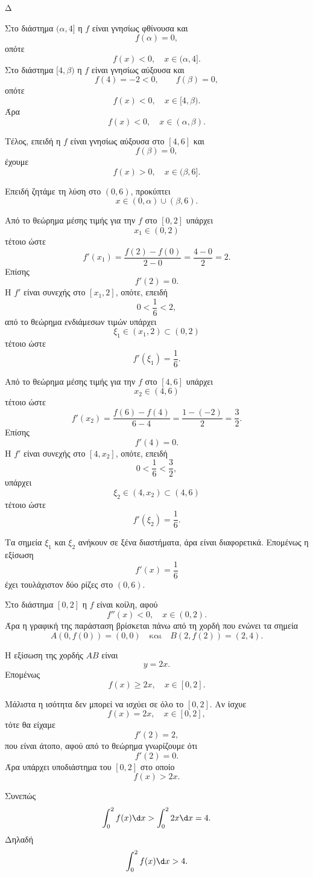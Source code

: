 \begin{thema}{Δ}
\begin{erwthma}
Στο διάστημα $(\alpha,4]$ η $f$ είναι γνησίως φθίνουσα και
\[
f(\alpha)=0,
\]
οπότε
\[
f(x)<0,\quad x\in(\alpha,4].
\]
Στο διάστημα $[4,\beta)$ η $f$ είναι γνησίως αύξουσα και
\[
f(4)=-2<0,\qquad f(\beta)=0,
\]
οπότε
\[
f(x)<0,\quad x\in[4,\beta).
\]
Άρα
\[
f(x)<0,\quad x\in(\alpha,\beta).
\]

Τέλος, επειδή η $f$ είναι γνησίως αύξουσα στο $[4,6]$ και
\[
f(\beta)=0,
\]
έχουμε
\[
f(x)>0,\quad x\in(\beta,6].
\]

Επειδή ζητάμε τη λύση στο $(0,6)$, προκύπτει
\[
{x\in(0,\alpha)\cup(\beta,6)}.
\]

\item Από το θεώρημα μέσης τιμής για την $f$ στο $[0,2]$ υπάρχει
\[
x_1\in(0,2)
\]
τέτοιο ώστε
\[
f'(x_1)=\frac{f(2)-f(0)}{2-0}
=\frac{4-0}{2}
=2.
\]
Επίσης
\[
f'(2)=0.
\]
Η $f'$ είναι συνεχής στο $[x_1,2]$, οπότε, επειδή
\[
0<\frac16<2,
\]
από το θεώρημα ενδιάμεσων τιμών υπάρχει
\[
\xi_1\in(x_1,2)\subset(0,2)
\]
τέτοιο ώστε
\[
f'(\xi_1)=\frac16.
\]

Από το θεώρημα μέσης τιμής για την $f$ στο $[4,6]$ υπάρχει
\[
x_2\in(4,6)
\]
τέτοιο ώστε
\[
f'(x_2)=\frac{f(6)-f(4)}{6-4}
=\frac{1-(-2)}{2}
=\frac32.
\]
Επίσης
\[
f'(4)=0.
\]
Η $f'$ είναι συνεχής στο $[4,x_2]$, οπότε, επειδή
\[
0<\frac16<\frac32,
\]
υπάρχει
\[
\xi_2\in(4,x_2)\subset(4,6)
\]
τέτοιο ώστε
\[
f'(\xi_2)=\frac16.
\]

Τα σημεία $\xi_1$ και $\xi_2$ ανήκουν σε ξένα διαστήματα, άρα είναι
διαφορετικά. Επομένως η εξίσωση
\[
f'(x)=\frac16
\]
έχει τουλάχιστον δύο ρίζες στο $(0,6)$.

\item Στο διάστημα $[0,2]$ η $f$ είναι κοίλη, αφού
\[
f''(x)<0,\quad x\in(0,2).
\]
Άρα η γραφική της παράσταση βρίσκεται πάνω από τη χορδή που ενώνει τα
σημεία
\[
A(0,f(0))=(0,0)
\quad\text{και}\quad
B(2,f(2))=(2,4).
\]

Η εξίσωση της χορδής $AB$ είναι
\[
y=2x.
\]
Επομένως
\[
f(x)\geq 2x,\quad x\in[0,2].
\]

Μάλιστα η ισότητα δεν μπορεί να ισχύει σε όλο το $[0,2]$. Αν ίσχυε
\[
f(x)=2x,\quad x\in[0,2],
\]
τότε θα είχαμε
\[
f'(2)=2,
\]
που είναι άτοπο, αφού από το θεώρημα  γνωρίζουμε ότι
\[
f'(2)=0.
\]
Άρα υπάρχει υποδιάστημα του $[0,2]$ στο οποίο
\[
f(x)>2x.
\]

Συνεπώς
\[
\int_0^2 f(x)\d x
>
\int_0^2 2x\d x
=4.
\]
Δηλαδή
\[
{\int_0^2 f(x)\d x>4}.
\]
\end{erwthma}
\end{thema}

